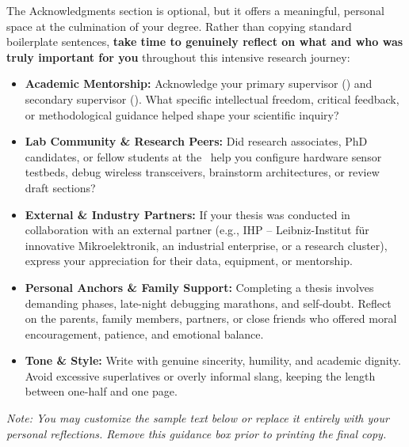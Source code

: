 
\begin{tcolorbox}[
    colback=white,
    colframe=btuDarkGray,
    title={\textbf{Student Writing Guide: Reflecting on What Matters to You}},
    fonttitle=\bfseries\sffamily,
    sharp corners,
    boxrule=0.8pt
]
\small
The Acknowledgments section is optional, but it offers a meaningful, personal space at the culmination of your degree. Rather than copying standard boilerplate sentences, \textbf{take time to genuinely reflect on what and who was truly important for you} throughout this intensive research journey:
\begin{itemize}[leftmargin=*,itemsep=2pt,topsep=2pt]
    \item \textbf{Academic Mentorship:} Acknowledge your primary supervisor (\PrimarySupervisor) and secondary supervisor (\SecondarySupervisor). What specific intellectual freedom, critical feedback, or methodological guidance helped shape your scientific inquiry?
    \item \textbf{Lab Community \& Research Peers:} Did research associates, PhD candidates, or fellow students at the \ChairName\ help you configure hardware sensor testbeds, debug wireless transceivers, brainstorm architectures, or review draft sections?
    \item \textbf{External \& Industry Partners:} If your thesis was conducted in collaboration with an external partner (e.g., IHP -- Leibniz-Institut f\"ur innovative Mikroelektronik, an industrial enterprise, or a research cluster), express your appreciation for their data, equipment, or mentorship.
    \item \textbf{Personal Anchors \& Family Support:} Completing a thesis involves demanding phases, late-night debugging marathons, and self-doubt. Reflect on the parents, family members, partners, or close friends who offered moral encouragement, patience, and emotional balance.
    \item \textbf{Tone \& Style:} Write with genuine sincerity, humility, and academic dignity. Avoid excessive superlatives or overly informal slang, keeping the length between one-half and one page.
\end{itemize}
\textit{Note: You may customize the sample text below or replace it entirely with your personal reflections. Remove this guidance box prior to printing the final copy.}
\end{tcolorbox}

